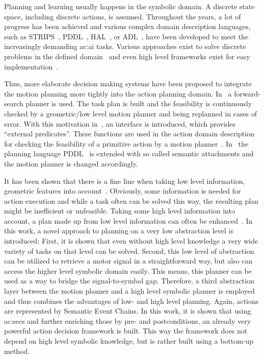 Planning and learning usually happens in the symbolic domain.
A discrete state space, including discrete actions, is assumed.
Throughout the years, a lot of progress has been achieved and various complex domain description languages, such as STRIPS~\cite{fikes1971}, PDDL~\cite{mcdermott1998}, HAL~\cite{marthi2007}, or ADL~\cite{pednault1994}, have been developed to meet the increasingly demanding \gls{ac:ai} tasks.
Various approaches exist to solve discrete problems in the defined domain~\cite{kuter2009} and even high level frameworks exist for easy implementation~\cite{agostinitorraswoergoetter2017, de2009indigolog}.

Thus, more elaborate decision making systems have been proposed to integrate the motion planning more tightly into the action planning domain.
In~\cite{hauser2009, kaelbling2011, plaku2010} a forward-search planner is used.
The task plan is built and the feasibility is continuously checked by a geometric/low level motion planner and being replanned in cases of error.
With this motivation in~\cite{caldiran2009, eyerich2010}, an interface is introduced, which provides ``external predicates''.
These functions are used in the action domain description for checking the feasibility of a primitive action by a motion planner~\cite{erdem2011}.
In~\cite{eyerich2010} the planning language PDDL~\cite{mcdermott1998} is extended with so called semantic attachments and the motion planner is changed accordingly.

It has been shown that there is a fine line when taking low level information, \ie geometric features into account~\cite{erdem2011}.
Obviously, some information is needed for action execution and while a task often can be solved this way, the resulting plan might be inefficient or unfeasible.
Taking some high level information into account, a plan made up from low level information can often be enhanced~\cite{erdem2011}.
In this work, a novel approach to planning on a very low abstraction level is introduced: First, it is shown that even without high level knowledge a very wide variety of tasks on that level can be solved.
Second, this low level of abstraction can be utilized to retrieve a motor signal in a straightforward way, but also can access the higher level symbolic domain easily.
This means, this planner can be used as a way to bridge the signal-to-symbol gap.
Therefore, a third abstraction layer between the motion planner and a high level symbolic planner is employed and thus combines the advantages of low- and high level planning.
Again, actions are represented by Semantic Event Chains.
In this work, it is shown that using \glspl{ac:sec} and further enriching those by pre- and postconditions, an already very powerful action decision framework is built.
This way the framework does not depend on high level symbolic knowledge, but is rather built using a bottom-up method.

